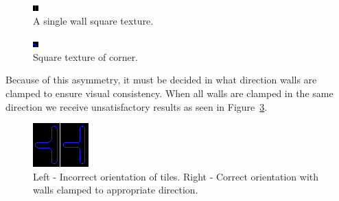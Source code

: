 \documentclass[a4paper,12pt]{article}
\begin{document}
\begin{figure}[H]
\centering
\includegraphics[width=0.4\linewidth]{Image-2.png}
\caption {A single wall square texture.\autocite{myself}}\label{StraightWallTexture}
\end{figure}

\begin{figure}[H]
\centering
\includegraphics[width=0.4\linewidth]{Image-3.png}
\caption {Square texture of corner.\autocite{myself}}\label{CornerTexture}
\end{figure}

Because of this asymmetry, it must be decided in what direction walls are clamped to ensure visual consistency. When all walls are clamped in the same direction we receive unsatisfactory results as seen in Figure~\ref{WallTextureAsymmetry}.

\begin{figure}[H]
\centering
\includegraphics[width=0.4\linewidth]{Image-4.png}
\caption {Left - Incorrect orientation of tiles. Right - Correct orientation with walls clamped to appropriate direction.\autocite{myself}}\label{WallTextureAsymmetry}
\end{figure}
\end{document}
